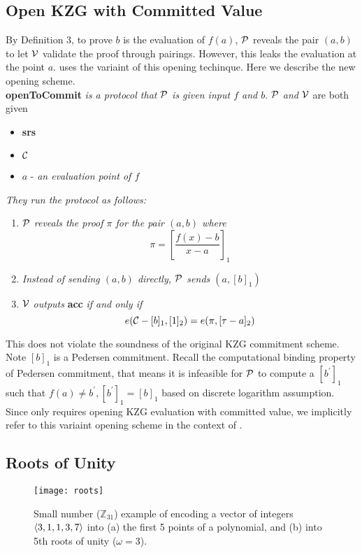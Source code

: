 \subsection{Open KZG with Committed Value}
\label{sec:kzgOpenComm}
By Definition 3, to prove $b$ is the evaluation of $f(a)$, $\mathcal{P}$ reveals the pair $(a,b)$ to let $\mathcal{V}$ validate the proof through pairings. However, this leaks the evaluation at the point $a$. \bootstrap uses the variaint of this opening techinque. Here we describe the new opening scheme. \\
\textbf{openToCommit} \textit{is a protocol that} $\mathcal{P}$ \textit{is given input $f$ and $b$}. $\mathcal{P}$ \textit{and} $\mathcal{V}$ are both given
\begin{itemize}
    \item \textbf{srs}
    \item $\mathcal{C}$
        \item $a$ - \textit{an evaluation point of $f$}
\end{itemize}
\textit{They run the protocol as follows:}
\begin{enumerate}
    \item $\mathcal{P}$ \textit{reveals the proof $\pi$ for the pair $(a,b)$ where}
    \[ \pi=[\frac{f(x)-b}{x-a}]_1 \]
    \item \textit{Instead of sending $(a,b)$ directly, $\mathcal{P}$ sends $(a,[b]_1)$}
    \item $\mathcal{V}$ \textit{outputs} \textbf{acc} \textit{if and only if}
    \[ e(\mathcal{C}-[b]_1,[1]_2)=e(\pi,[\tau-a]_2) \]
\end{enumerate}
This does not violate the soundness of the original KZG commitment scheme. Note $[b]_1$ is a Pedersen commitment. Recall the computational binding property of Pedersen commitment, that means it is infeasible for $\mathcal{P}$ to compute a $[b^\prime]_1$ such that $f(a)\ne{b^\prime},[b^\prime]_1=[b]_1$ based on discrete logarithm assumption. Since only \bootstrap requires opening KZG evaluation with committed value, we implicitly refer to this variaint opening scheme in the context of \bootstrap.

\subsection{Roots of Unity}
\label{app:rou}

\begin{figure}
\centering
\texttt{[image: roots]}
\caption{Small number ($\mathbb{Z}_{31}$) example of encoding a vector of integers $\left \langle 3,1,1,3,7 \right \rangle$ into (a) the first 5 points of a polynomial, and (b) into 5th roots of unity ($\omega=3$).\label{fig:rou}}
\end{figure}

